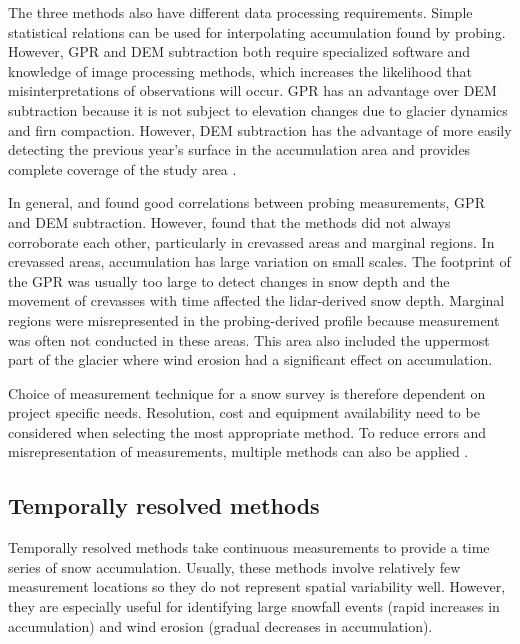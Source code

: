 \documentclass{sfuthesis}
\begin{document}
The three methods also have different data processing requirements. Simple statistical relations can be used for interpolating accumulation found by probing. However, GPR and DEM subtraction both require specialized software and knowledge of image processing methods, which increases the likelihood that misinterpretations of observations will occur. GPR has an advantage over DEM subtraction because it is not subject to elevation changes due to glacier dynamics and firn compaction. However, DEM subtraction has the advantage of more easily detecting the previous year's surface in the accumulation area and provides complete coverage of the study area \citep{Sold2013}. 

In general, \cite{Machguth2006} and \cite{Sold2013} found good correlations between probing measurements, GPR and DEM subtraction. However, \citep{Sold2013} found that the methods did not always corroborate each other, particularly in crevassed areas and marginal regions. In crevassed areas, accumulation has large variation on small scales. The footprint of the GPR was usually too large to detect changes in snow depth and the movement of crevasses with time affected the lidar-derived snow depth. Marginal regions were misrepresented in the probing-derived profile because measurement was often not conducted in these areas. This area also included the uppermost part of the glacier where wind erosion had a significant effect on accumulation. 

Choice of measurement technique for a snow survey is therefore dependent on project specific needs. Resolution, cost and equipment availability need to be considered when selecting the most appropriate method. To reduce errors and misrepresentation of measurements, multiple methods can also be applied \citep{Machguth2006}. 

\subsection{Temporally resolved methods}
Temporally resolved methods take continuous measurements to provide a time series of snow accumulation. Usually, these methods involve relatively few measurement locations so they do not represent spatial variability well. However, they are especially useful for identifying large snowfall events (rapid increases in accumulation) and wind erosion (gradual decreases in accumulation). 
\end{document}
